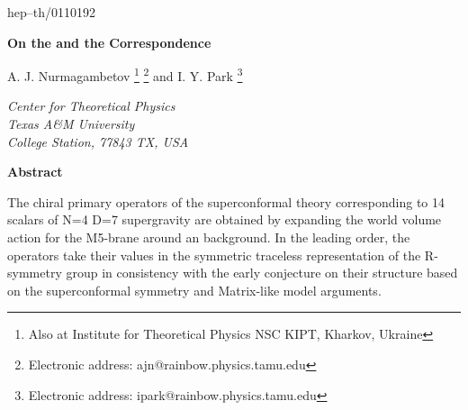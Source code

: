 \documentclass[a4paper,11pt]{article}
\begin{document}
\def\a{\alpha}\def\b{\beta}\def\g{\gamma}\def\d{\delta}\def\e{\epsilon }
\def\k{\kappa}\def\l{\lambda}\def\L{\Lambda}\def\s{\sigma}\def\S{\Sigma}
\def\Th{\Theta}\def\th{\theta}\def\om{\omega}\def\Om{\Omega}\def\G{\Gamma}
\def\y{\vartheta}\def\m{\mu}\def\n{\nu}
\def\ws{worldsheet}
\def\susy{supersymmetry}
\def\ts{target superspace}
\def\ks{\myHighlight{$\k$}\coordHE{}--symmetry}
\providecommand{\plabel}{\label}
\renewcommand\baselinestretch{1.5}
\providecommand{\nn}{\nonumber\\}\providecommand{\p}[1]{(\ref{#1})}
\renewcommand{\thefootnote}{\fnsymbol{footnote}}
\thispagestyle{empty}
\begin{flushright}
hep--th/0110192
\end{flushright}






\bigskip
\thispagestyle{empty}

\vspace{1cm}
\begin{center}
{\Large\bf On the \coordHE{} and the \coordHE{} Correspondence}



\vspace{2.5cm}
A. J. Nurmagambetov \footnote{Also at Institute for Theoretical
Physics NSC KIPT, Kharkov, Ukraine} \footnote{Electronic address:
ajn@rainbow.physics.tamu.edu} and I. Y. Park \footnote{Electronic
address: ipark@rainbow.physics.tamu.edu}


\vspace{1.8cm}
{\small\it Center for Theoretical Physics\\
Texas A\&M University\\
College Station, 77843 TX, USA}



\vspace{3.3cm} {\bf Abstract}
\end{center}
The chiral primary operators of the \coordHE{} superconformal \coordHE{} theory
corresponding to 14 scalars of N=4 D=7 supergravity are obtained by
expanding the world volume action for the M5-brane around an \coordHE{}
background. In the leading order, the operators take their values in the symmetric traceless
representation of the \coordHE{} R-symmetry group in consistency with the early
conjecture on their structure based on the superconformal symmetry and Matrix-like model arguments.
\end{document}
